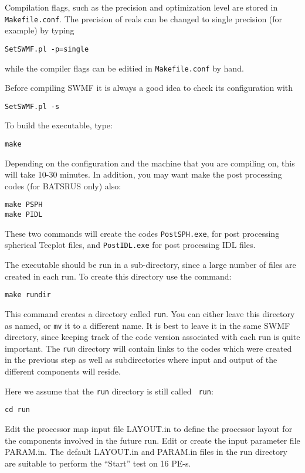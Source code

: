 Compilation flags, such as the precision and optimization 
level are stored in {\tt Makefile.conf}. The precision of reals
can be changed to single precision (for example) by typing
\begin{verbatim}
SetSWMF.pl -p=single
\end{verbatim}
while the compiler flags can be editied in {\tt Makefile.conf} by hand.

Before compiling SWMF it is always a good idea to check its configuration
with
\begin{verbatim}
SetSWMF.pl -s
\end{verbatim}
To build the executable, type:
\begin{verbatim}
make
\end{verbatim} 
Depending on the configuration and the machine that you are compiling on, 
this will take 10-30 minutes.  
In addition, you may want make the post processing
codes (for BATSRUS only) also:
\begin{verbatim}
make PSPH
make PIDL
\end{verbatim} 
These two commands will create the codes {\tt PostSPH.exe}, for post
processing spherical Tecplot files, and {\tt PostIDL.exe} 
for post processing IDL files.

The executable should be run in a sub-directory, since a large number
of files are created in each run.  To create this directory use the
command:
\begin{verbatim}
make rundir
\end{verbatim} 
This command creates a directory called {\tt run}.  You can either
leave this directory as named, or {\tt mv} it to a different name.  It
is best to leave it in the same SWMF directory, since
keeping track of the code version associated with each run is quite
important.  The {\tt run} directory will contain links to the codes
which were created in the previous step as well as subdirectories
where input and output of the different components will reside.

Here we assume that the {\tt run} directory is still called {\tt
run}:
\begin{verbatim}
cd run
\end{verbatim} 
Edit the processor map input file LAYOUT.in to define the processor
layout for the components involved in the future run.  Edit or create
the input parameter file PARAM.in.  The default LAYOUT.in and PARAM.in
files in the run directory are suitable to perform the ``Start'' test
on 16 PE-s. 

